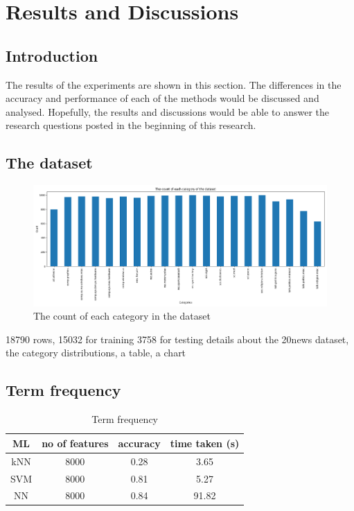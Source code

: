 
\chapter{Results and Discussions}

\section{Introduction}
The results of the experiments are shown in this section. The differences in the accuracy and performance of each of the methods would be discussed and analysed. Hopefully, the results and discussions would be able to answer the research questions posted in the beginning of this research.

\section{The dataset}
\graphicspath{{./images/}}

\begin{figure} [ht]
\centering
\includegraphics[width=\textwidth]{count}
\caption{The count of each category in the dataset}
\label{fig:freqCount}
\end{figure}

18790 rows, 15032 for training 3758 for testing
details about the 20news dataset, the category distributions, a table, a chart

\section{Term frequency}

\begin{table}[ht]
	\centering
	\begin{tabular}{|| c | c | c | c||}
		\hline
		ML & no of features & accuracy & time taken (s) \\ [0.5ex]
		\hline\hline
		kNN & 8000 & 0.28 & 3.65 \\ 
		\hline
		SVM & 8000 & 0.81 & 5.27 \\
		\hline
		NN & 8000 & 0.84 & 91.82 \\
		\hline
	\end{tabular}
\caption{Term frequency}
\label{tbl:termFrequency}
\end{table}

